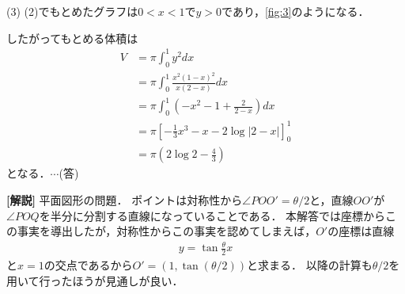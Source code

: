 \documentclass[a4paper,10pt]{ltjsarticle}
\begin{document}
\begin{multicols}{2}
(3)
(2)でもとめたグラフは$0<x<1$で$y>0$であり，\cref{fig:3}のようになる．

\begin{figure}[H]
\end{figure}

したがってもとめる体積は
\begin{align*}
V 
&= \pi \int_0^1 y^2 dx \\
&= \pi \int_0^1 \frac{x^2(1-x)^2}{x(2-x)} dx \\
&= \pi \int_0^1 \left(-x^2 - 1 + \frac{2}{2-x}\right) dx \\
&= \pi \left[-\frac{1}{3}x^3 - x - 2\log|2-x|\right]_0^1 \\
&= \pi \left(2\log 2 - \frac{4}{3}\right)    
\end{align*}
となる．$\cdots$(答)

{\bf[解説]}
平面図形の問題．
ポイントは対称性から$\angle POO'=\theta/2$と，直線$OO'$が$\angle POQ$を半分に分割する直線になっていることである．
本解答では座標からこの事実を導出したが，対称性からこの事実を認めてしまえば，$O'$の座標は直線
\begin{align*}
    y = \tan\frac{\theta}{2} x
\end{align*}
と$x=1$の交点であるから$O'=(1,\tan(\theta/2))$と求まる．
以降の計算も$\theta/2$を用いて行ったほうが見通しが良い．

\newpage
\end{multicols}
\end{document}
